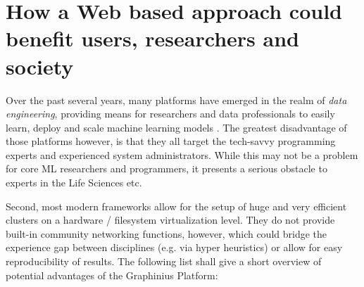 \section{How a Web based approach could benefit users, researchers and society}
\label{sect:web_benefits}

Over the past several years, many platforms have emerged in the realm of \textit{data engineering}, providing means for researchers and data professionals to easily learn, deploy and scale machine learning models 
\cite{DataScienceTools2013}. The greatest disadvantage of those platforms however, is that they all target the tech-savvy programming experts and experienced system administrators. While this may not be a problem for core ML researchers and programmers, it presents a serious obstacle to experts in the Life Sciences etc.

Second, most modern frameworks allow for the setup of huge and very efficient clusters on a hardware / filesystem virtualization level. They do not provide built-in community networking functions, however, which could bridge the experience gap between disciplines (e.g. via hyper heuristics) or allow for easy reproducibility of results. The following list shall give a short overview of potential advantages of the Graphinius Platform:

